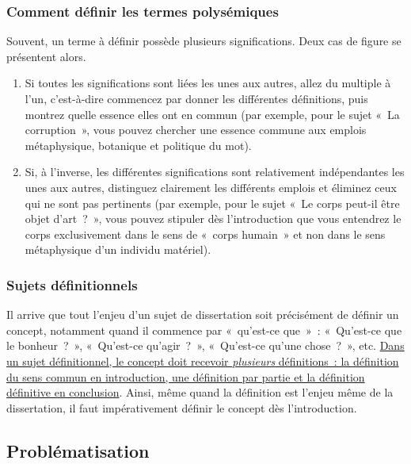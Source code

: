 \documentclass[a4paper,12pt]{article}
\begin{document}
\subsubsection{Comment définir les termes polysémiques}
\label{sec:org7573270}

Souvent, un terme à définir possède plusieurs significations. Deux cas
de figure se présentent alors. 

\begin{enumerate}
\item Si toutes les significations sont liées les unes aux autres, allez du
multiple à l'un, c'est-à-dire commencez par donner les différentes
définitions, puis montrez quelle essence elles ont en commun (par
exemple, pour le sujet « La corruption », vous pouvez chercher une
essence commune aux emplois métaphysique, botanique et politique du
mot).
\item Si, à l'inverse, les différentes significations sont relativement
indépendantes les unes aux autres, distinguez clairement les
différents emplois et éliminez ceux qui ne sont pas pertinents (par
exemple, pour le sujet « Le corps peut-il être objet d'art ? », vous
pouvez stipuler dès l'introduction que vous entendrez le corps
exclusivement dans le sens de « corps humain » et non dans le sens
métaphysique d'un individu matériel).
\end{enumerate}

\subsubsection{Sujets définitionnels}
\label{sec:orgaaec7be}

Il arrive que tout l'enjeu d'un sujet de dissertation soit précisément
de définir un concept, notamment quand il commence par « qu'est-ce
que » : « Qu'est-ce que le bonheur ? », « Qu'est-ce qu'agir ? »,
« Qu'est-ce qu'une chose ? », etc. \uline{Dans un sujet définitionnel, le
concept doit recevoir \emph{plusieurs} définitions : la définition du sens
commun en introduction, une définition par partie et la définition
définitive en conclusion}. Ainsi, même quand la définition est l'enjeu
même de la dissertation, il faut impérativement définir le concept dès
l'introduction.


\subsection{Problématisation}
\label{sec:org285cabf}
\label{org7b85b68}
\end{document}

